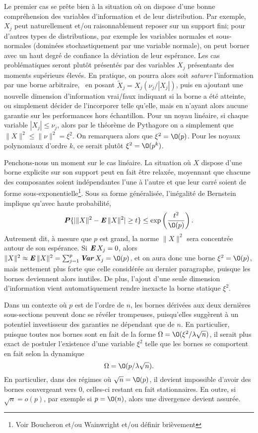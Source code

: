 Le premier cas se prête bien à la situation où on dispose d'une bonne compréhension des
variables d'information et de leur distribution. Par exemple, $X_j$ peut naturellement
et/ou raisonnablement reposer sur un support fini; pour d'autres types de distributions,
par exemple les variables normales et sous-normales (dominées stochastiquement par une
variable normale), on peut borner avec un haut degré de confiance la déviation de leur
espérance. Les cas problématiques seront plutôt présentés par des variables $X_j$
présentants des moments supérieurs élevés. En pratique, on pourra alors soit
\textit{saturer} l'information par une borne arbitraire, \ie\ en posant
$\tilde X_j = X_j(\nu_j/|X_j|)$, puis en ajoutant une nouvelle dimension d'information
vrai/faux indiquant si la borne a été atteinte, ou simplement décider de l'incorporer
telle qu'elle, mais en n'ayant alors aucune garantie sur les performances hors
échantillon. Pour un noyau linéaire, si chaque variable $|X_j| \leq \nu_j$, alors par le
théorème de Pythagore on a simplement que $\|X\|^2 \leq \|\nu\|^2 = \xi^2$. On remarquera alors
que $\xi^2 = \O(p)$. Pour les noyaux polynomiaux d'ordre $k$, ce serait plutôt
$\xi^2 = \O(p^k)$.

Penchons-nous un moment sur le cas linéaire. La situation où $X$ dispose d'une borne
explicite sur son support peut en fait être relaxée, moyennant que chacune des composantes
soient indépendantes l'une à l'autre et que leur carré soient de forme
sous-exponentielle\footnote{Voir Boucheron et/ou Wainwright et/ou définir
  brièvement}. Sous sa forme généralisée, l'inégalité de Bernstein implique qu'avec haute
probabilité,
\begin{equation}
  \pp\{|\|X\|^2 - \E\|X\|^2| \geq t\} \leq \exp\left(\frac{t^2}{\O(p)}\right).
\end{equation}
Autrement dit, à mesure que $p$ est grand, la norme $\|X\|^2$ sera concentrée autour de
son espérance. Si $\operatorname{\mbox{\textbf{\textit{E}}}} X_j=0$, alors $\|X\|^2 \approx \E\|X\|^2 = \sumj \Var X_j = \O(p)$, et on
aura donc une borne $\xi^2 = \O(p)$, mais nettement plus forte que celle considérée au
dernier paragraphe, puisque les bornes deviennent alors inutiles. De plus, l'ajout d'une
seule dimension d'information vient automatiquement rendre inexacte la borne statique
$\xi^2$. 

Dans un contexte où $p$ est de l'ordre de $n$, les bornes dérivées aux deux dernières
sous-sections peuvent donc se révéler trompeuses, puisqu'elles suggèrent à un potentiel
investisseur des garanties ne dépendant que de $n$. En particulier, puisque toutes nos
bornes sont en fait de la forme $\Omega = \O(\xi^2/\lambda\sqrt{n})$, il serait plus exact de postuler
l'existence d'une variable $\xi^2$ telle que les bornes se comportent en fait selon la
dynamique
\begin{equation}
  \Omega = \O(p/\lambda\sqrt{n}).
\end{equation}
En particulier, dans des régimes où $\sqrt{n}=\O(p)$, il devient impossible d'avoir des
bornes convergeant vers 0, celles-ci restant en fait stationnaires. En outre, si
$\sqrt{n}=o(p)$, par exemple si $p=\O(n)$, alors une divergence devient assurée.

